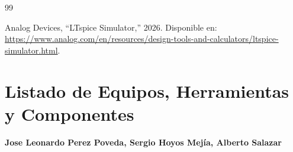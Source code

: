\documentclass[12pt]{article}
\newcommand{\estudiantes}{Jose Leonardo Perez Poveda, Sergio Hoyos Mejía, Alberto Salazar}
\begin{document}

\begin{thebibliography}{99}

Analog Devices,
``LTspice Simulator,''
2026.
Disponible en:
\url{https://www.analog.com/en/resources/design-tools-and-calculators/ltspice-simulator.html}.

\end{thebibliography}


\newpage

\section*{Listado de Equipos, Herramientas y Componentes}

{\textbf{\estudiantes}}
\end{document}
